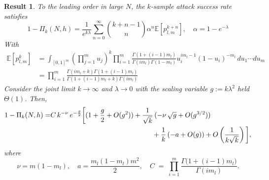 \documentclass{article}
\newtheorem{theorem}{Result}
\theoremstyle{remark} %
\begin{document}
\begin{theorem}
\label{thm:field_scaling}
To the leading order in large $N$, the $k$-sample attack success rate satisfies
\begin{equation}
1-\Pi_k(N,h) = \frac{1}{e^{k\lambda}} \sum_{n=0}^\infty \binom{k+n-1}{n} \alpha^n \mathbb{E}[p_{l,m}^{k+n}], \quad \alpha =1-e^{-\lambda}
\label{eq:series_moments}
\end{equation}
With
\begin{equation}
\begin{aligned}
\mathbb{E}[p_{l,m}^k] &= \int_{[0,1]^m} \left(\prod_{j=1}^m u_j\right)^k \prod_{i=1}^m \frac{\Gamma(1+(i-1)m_l)}{\Gamma(im_l)\Gamma(1-m_l)} u_i^{im_l-1}(1-u_i)^{-m_l} \, du_1 \cdots du_m \\
&= \prod_{i=1}^m \frac{\Gamma(im_l+k)\Gamma(1+(i-1)m_l)}{\Gamma(1+(i-1)m_l+k)\Gamma(im_l)}
\end{aligned}
\end{equation}
Consider the joint limit $k\to\infty$ and $\lambda \to 0$ with the scaling variable
$g:=k\lambda^2$
held $\Theta(1)$. Then,
\begin{equation}
\begin{aligned}
    1-\Pi_k(N,h)
=&
C\,k^{-\nu}\,e^{-\frac{g}{2}}
\bigg[
(1+\frac{g}{2}+O(g^2))
+\frac{1}{\sqrt{k}}\,( -\nu\,\sqrt{g}+O(g^{3/2}))
\\& \hspace{5.2cm} +\frac{1}{k}\,(-a+O(g))
+O \left(\frac{1}{k\sqrt{k}}\right)
\bigg],
\end{aligned}
\label{eq:app_thm_asr_magnetic_field}
\end{equation}
where
$$
\nu = m(1-m_l), \quad 
a = \frac{m_l(1-m_l)m^2}{2}, \quad C\;=\;\prod_{i=1}^{m}\frac{\Gamma \big(1+(i-1)m_l\big)}{\Gamma(im_l)}.
$$
\end{theorem}
\end{document}
